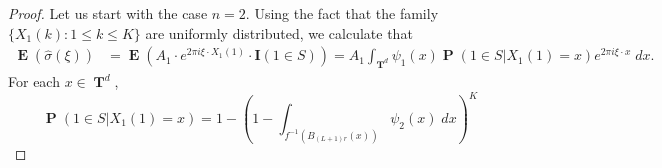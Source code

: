 \documentclass[12pt,reqno]{article}
\numberwithin{equation}{section}
\DeclareMathOperator{\TT}{\mathbf{T}}
\numberwithin{theorem}{section}
\DeclareMathOperator{\EE}{\mathbf{E}}
\DeclareMathOperator{\PP}{\mathbf{P}}
\begin{document}
\begin{proof}
%
%
%
%



    Let us start with the case $n = 2$. Using the fact that the family $\{ X_1(k) : 1 \leq k \leq K \}$ are uniformly distributed, we calculate that
    \begin{equation} \label{equationDJACIOJCOWIJ}
    \begin{split}
        \EE(\widehat{\sigma}(\xi)) &= \EE ( A_1 \cdot e^{2 \pi i \xi \cdot X_1(1)} \cdot \mathbf{I}(1 \in S) ) = A_1 \int_{\TT^d} \psi_1(x) \PP \left( 1 \in S | X_1(1) = x \right) e^{2 \pi i \xi \cdot x}\; dx.
    \end{split}
    \end{equation}
    For each $x \in \TT^d$,
    \[ \PP(1 \in S | X_1(1) = x) = 1 - \left( 1 - \int_{f^{-1}(B_{(L+1)r}(x))} \psi_2(x)\; dx \right)^K \]


\end{proof}
\end{document}
